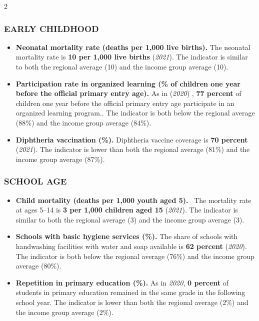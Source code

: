 \documentclass[
  9pt,
]{article}
\begin{document}
\begin {multicols}{2}

\hypertarget{section-3}{%
\subsubsection{\texorpdfstring{\textcolor{bondiblue}{\textbf{E\small{ARLY CHILDHOOD}}}}{}}\label{section-3}}

\begin{itemize}
\item
  \textbf{Neonatal mortality rate (deaths per 1,000 live births).} The
  neonatal mortality rate is \textbf{10 per 1,000 live births}
  (\emph{2021}). The indicator is similar to both the regional average
  (10) and the income group average (10).
\item
  \textbf{Participation rate in organized learning (\% of children one
  year before the official primary entry age).} As in (\emph{2020}) ,
  \textbf{77 percent} of children one year before the official primary
  entry age participate in an organized learning program.. The indicator
  is both below the regional average (88\%) and the income group average
  (84\%).
\item
  \textbf{Diphtheria vaccination (\%).} Diphtheria vaccine coverage is
  \textbf{70 percent} (\emph{2021}). The indicator is lower than both
  the regional average (81\%) and the income group average (87\%).
\end{itemize}

\hypertarget{section-4}{%
\subsubsection{\texorpdfstring{\textcolor{bondiblue}{\textbf{S\small{CHOOL AGE}}}}{}}\label{section-4}}

\begin{itemize}
\item
  \textbf{Child mortality (deaths per 1,000 youth aged 5).} ~The
  mortality rate at ages 5--14 is \textbf{3 per 1,000 children aged 15}
  (\emph{2021}). The indicator is similar to both the regional average
  (3) and the income group average (3).
\item
  \textbf{Schools with basic hygiene services (\%).} The share of
  schools with handwashing facilities with water and soap available is
  \textbf{62 percent} (\emph{2020}). The indicator is both below the
  regional average (76\%) and the income group average (80\%).
\item
  \textbf{Repetition in primary education (\%).} As in \emph{2020},
  \textbf{0 percent} of students in primary education remained in the
  same grade in the following school year. The indicator is lower than
  both the regional average (2\%) and the income group average (2\%).
\end{itemize}


\end{multicols}
\end{document}
